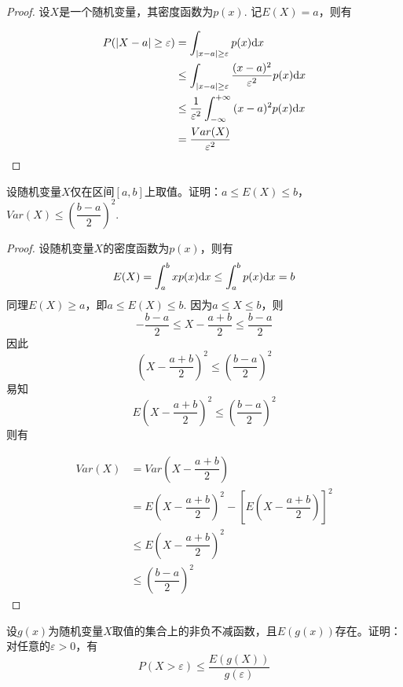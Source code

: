 \begin{proof}

    设$X$是一个随机变量，其密度函数为$p(x)$. 记$E(X) = a$，则有

    \begin{align*}
        P(|X - a| \geq \varepsilon) & = \int_{|x - a| \geq \varepsilon}{p(x)}\mathrm{d} x \\
        & \leq \int_{|x - a| \geq \varepsilon}{\dfrac{(x - a)^2}{\varepsilon^2}p(x)}\mathrm{d} x \\
        & \leq \dfrac{1}{\varepsilon^2}\int_{-\infty}^{+\infty}{(x - a)^2p(x)}\mathrm{d} x \\
        & = \dfrac{Var(X)}{\varepsilon^2}
    \end{align*}
    
\end{proof}

\begin{proposition}
    
    设随机变量$X$仅在区间$[a,b]$上取值。证明：$a \leq E(X) \leq b$，$Var(X) \leq \left( \dfrac{b - a}{2} \right)^2$.

\end{proposition}

\begin{proof}

    设随机变量$X$的密度函数为$p(x)$，则有
    $$E(X) = \int_{a}^{b}{xp(x)}\mathrm{d} x \leq \int_{a}^{b}{p(x)}\mathrm{d} x = b$$
    同理$E(X) \geq a$，即$a \leq E(X) \leq b$.
    因为$a \leq X \leq b$，则
    $$-\dfrac{b - a}{2} \leq X - \dfrac{a + b}{2} \leq \dfrac{b - a}{2}$$
    因此
    $$\left( X - \dfrac{a + b}{2} \right)^2 \leq \left( \dfrac{b - a}{2} \right)^2$$
    易知
    $$E \left( X - \dfrac{a + b}{2} \right)^2 \leq \left( \dfrac{b - a}{2} \right)^2$$
    则有
    
    \begin{align*}
        Var(X) & = Var\left( X - \dfrac{a + b}{2} \right) \\
        & = E \left( X - \dfrac{a + b}{2} \right)^2 - \left[ E\left( X - \dfrac{a + b}{2} \right) \right]^2 \\
        & \leq E\left( X - \dfrac{a + b}{2} \right)^2 \\
        & \leq \left( \dfrac{b - a}{2} \right)^2
    \end{align*}

\end{proof}

\begin{proposition}

    设$g(x)$为随机变量$X$取值的集合上的非负不减函数，且$E(g(x))$存在。证明：对任意的$\varepsilon > 0$，有
    $$P(X > \varepsilon) \leq \dfrac{E(g(X))}{g(\varepsilon)}$$

\end{proposition}

